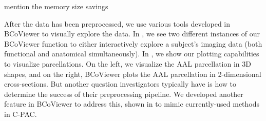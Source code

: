 \documentclass{nature}
\begin{document}
{\color{red}mention the memory size savings}

After the data has been preprocessed, we use various tools developed in
BCoViewer
to visually explore the data. In , we see two different
instances
of our BCoViewer function to either interactively explore a subject's imaging
data (both
functional and anatomical simultaneously). 
In , we show our plotting capabilities to visualize parcellations.
On the left, we visualize the AAL parcellation in 3D shapes, and on the right, BCoViewer plots the AAL
parcellation in 2-dimensional cross-sections. But another question investigators typically
have is 
how to determine the success of their preprocessing pipeline. We developed
another feature
in BCoViewer to address this, shown in  to mimic
currently-used methods
in C-PAC.
\end{document}
